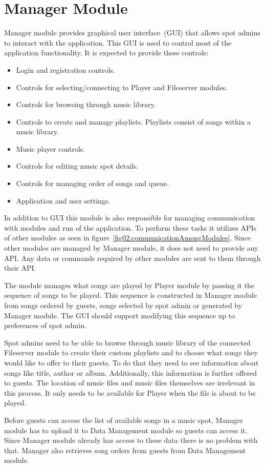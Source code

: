 \section {Manager Module}

Manager module provides graphical user interface~(GUI) that allows spot admins to interact with the application. This GUI is used to control most of the application functionality. It is expected to provide these controls:
\begin{itemize}
    \item Login and registration controls.
    \item Controls for selecting/connecting to Player and Fileserver modules.
    \item Controls for browsing through music library.
    \item Controls to create and manage playlists. Playlists consist of songs within a music library.
    \item Music player controls.
    \item Controls for editing music spot details.
    \item Controls for managing order of songs and queue.
    \item Application and user settings.
\end{itemize}

\par
In addition to GUI this module is also responsible for managing communication with modules and run of the application. To perform these tasks it utilizes APIs of other modules as seen in figure~\ref{fig02:communicationAmongModules}. Since other modules are managed by Manager module, it does not need to provide any API. Any data or commands required by other modules are sent to them through their API.
\par
The module manages what songs are played by Player module by passing it the sequence of songs to be played. This sequence is constructed in Manager module from songs ordered by guests, songs selected by spot admin or generated by Manager module. The GUI should support modifying this sequence up to preferences of spot admin.
\par
Spot admins need to be able to browse through music library of the connected Fileserver module to create their custom playlists and to choose what songs they would like to offer to their guests. To do that they need to see information about songs like title, author or album. Additionally, this information is further offered to guests. The location of music files and music files themselves are irrelevant in this process. It only needs to be available for Player when the file is about to be played.
\par
Before guests can access the list of available songs in a music spot, Manager module has to upload it to Data Management module so guests can access it. Since Manager module already has access to these data there is no problem with that. Manager also retrieves song orders from guests from Data Management module.

